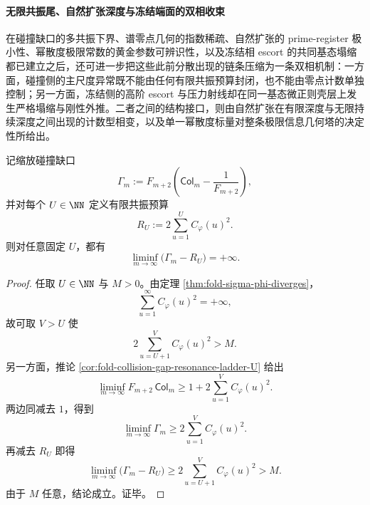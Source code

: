 \paragraph{无限共振尾、自然扩张深度与冻结端面的双相收束}
在碰撞缺口的多共振下界、谱零点几何的指数稀疏、自然扩张的 prime-register 极小性、幂散度极限常数的黄金参数可辨识性，以及冻结相 escort 的共同基态塌缩都已建立之后，还可进一步把这些此前分散出现的链条压缩为一条双相机制：一方面，碰撞侧的主尺度异常既不能由任何有限共振预算封闭，也不能由零点计数单独控制；另一方面，冻结侧的高阶 escort 与压力射线却在同一基态微正则壳层上发生严格塌缩与刚性外推。二者之间的结构接口，则由自然扩张在有限深度与无限持续深度之间出现的计数型相变，以及单一幂散度标量对整条极限信息几何塔的决定性所给出。

\begin{theorem}[碰撞缺口的无限共振秩]\label{thm:xi-time-part75a-collision-gap-infinite-resonance-rank}
记缩放碰撞缺口
\[
\Gamma_m:=F_{m+2}\!\left(\mathsf{Col}_m-\frac{1}{F_{m+2}}\right),
\]
并对每个 \(U\in\NN\) 定义有限共振预算
\[
R_U:=2\sum_{u=1}^{U}C_\varphi(u)^2.
\]
则对任意固定 \(U\)，都有
\[
\liminf_{m\to\infty}\bigl(\Gamma_m-R_U\bigr)=+\infty.
\]
\end{theorem}
\begin{proof}
任取 \(U\in\NN\) 与 \(M>0\)。由定理 \ref{thm:fold-sigma-phi-diverges}，
\[
\sum_{u=1}^{\infty}C_\varphi(u)^2=+\infty,
\]
故可取 \(V>U\) 使
\[
2\sum_{u=U+1}^{V}C_\varphi(u)^2>M.
\]
另一方面，推论 \ref{cor:fold-collision-gap-resonance-ladder-U} 给出
\[
\liminf_{m\to\infty}F_{m+2}\,\mathsf{Col}_m
\ge
1+2\sum_{u=1}^{V}C_\varphi(u)^2.
\]
两边同减去 \(1\)，得到
\[
\liminf_{m\to\infty}\Gamma_m
\ge
2\sum_{u=1}^{V}C_\varphi(u)^2.
\]
再减去 \(R_U\) 即得
\[
\liminf_{m\to\infty}\bigl(\Gamma_m-R_U\bigr)
\ge
2\sum_{u=U+1}^{V}C_\varphi(u)^2
>
M.
\]
由于 \(M\) 任意，结论成立。证毕。
\end{proof}

